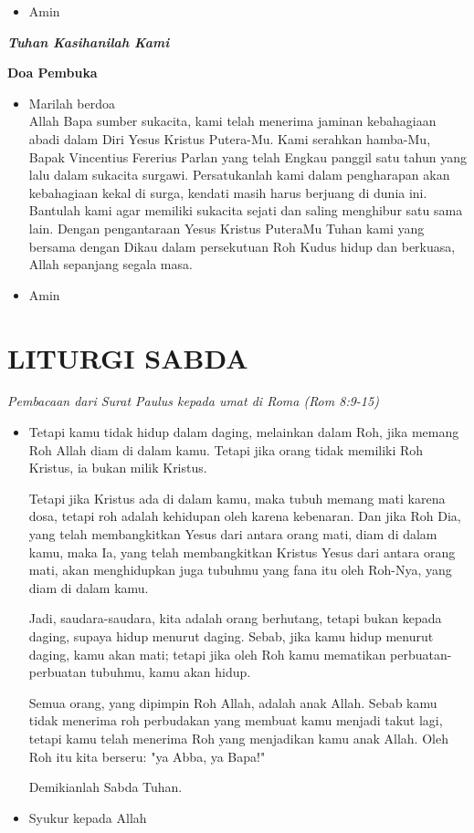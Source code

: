 \documentclass[titlepage,10pt,openany]{scrbook}
\makeatletter
\newcommand{\subjudul}[1]{%
  {\parindent \z@ 
    \interlinepenalty\@M \bfseries #1\par\nobreak \vskip 10\p@ }}
\newcommand{\lagu}[1]{%
  {\parindent \z@ 
    \interlinepenalty\@M \slshape \bfseries \normalsize \textit{#1}\par\nobreak \vskip 10\p@ }}
\newcommand{\keterangan}[1]{%
  {\parindent \z@  \slshape 
    \interlinepenalty\@M \textsl{#1}\par\nobreak  \vskip 5\p@}}
\newcommand{\BU}[1]{\begin{itemize} \item[U:] #1 \end{itemize}}
\newcommand{\BI}[1]{\begin{itemize} \item[I:] #1 \end{itemize}}
\newcommand{\BP}[1]{\begin{itemize} \item[P:] #1 \end{itemize}}
\newcommand{\namaalm}{Bapak Vincentius Fererius Parlan }
\makeatother
\begin{document}
\BU{Amin}

\lagu{Tuhan Kasihanilah Kami} 

\subjudul{Doa Pembuka}

\BI{Marilah berdoa\\
	Allah Bapa sumber sukacita, kami telah menerima jaminan kebahagiaan abadi dalam Diri Yesus Kristus Putera-Mu. Kami serahkan hamba-Mu, \namaalm{} yang telah Engkau panggil satu tahun yang lalu dalam sukacita surgawi. Persatukanlah kami dalam pengharapan akan kebahagiaan kekal di surga, kendati masih harus berjuang di dunia ini. Bantulah kami agar memiliki sukacita sejati dan saling menghibur satu sama lain. Dengan pengantaraan Yesus Kristus PuteraMu Tuhan kami yang bersama dengan Dikau dalam persekutuan Roh Kudus hidup dan berkuasa, Allah sepanjang segala masa.}

\BU{Amin}

 

\section*{LITURGI SABDA} 

\keterangan{Pembacaan dari Surat Paulus kepada umat di
Roma (Rom 8:9-15)}

\BP{Tetapi kamu tidak hidup dalam daging, melainkan dalam Roh, jika memang Roh Allah diam di dalam kamu. Tetapi jika orang tidak memiliki Roh Kristus, ia bukan milik Kristus.

Tetapi jika Kristus ada di dalam kamu, maka tubuh memang mati karena dosa, tetapi roh adalah kehidupan oleh karena kebenaran.
Dan jika Roh Dia, yang telah membangkitkan Yesus dari antara orang mati, diam di dalam kamu, maka Ia, yang telah membangkitkan Kristus Yesus dari antara orang mati, akan menghidupkan juga tubuhmu yang fana itu oleh Roh-Nya, yang diam di dalam kamu.

Jadi, saudara-saudara, kita adalah orang berhutang, tetapi bukan kepada daging, supaya hidup menurut daging.
Sebab, jika kamu hidup menurut daging, kamu akan mati; tetapi jika oleh Roh kamu mematikan perbuatan-perbuatan tubuhmu, kamu akan hidup.

Semua orang, yang dipimpin Roh Allah, adalah anak Allah.
Sebab kamu tidak menerima roh perbudakan yang membuat kamu menjadi takut lagi, tetapi kamu telah menerima Roh yang menjadikan kamu anak Allah. Oleh Roh itu kita berseru: "ya Abba, ya Bapa!"

Demikianlah Sabda Tuhan.}

\BU{Syukur kepada Allah}
\end{document}

